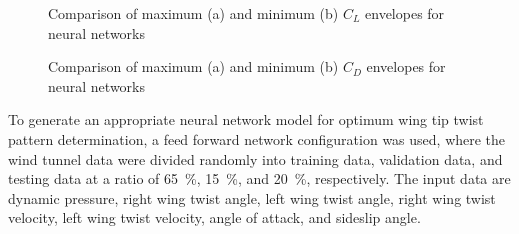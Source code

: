 \documentclass[11pt]{ucthesis}
\begin{document}
\begin{figure}[thpb]
\centering
{} 
\caption{Comparison of maximum (a) and minimum (b) $C_L$ envelopes for neural networks}
\label{fig:NNCLMax}
\end{figure}

\begin{figure}[thpb]
\centering
{} 
\caption{Comparison of maximum (a) and minimum (b) $C_D$ envelopes for neural networks}
\label{fig:NNCDMax}
\end{figure}

To generate an appropriate neural network model for optimum wing tip twist pattern determination, a feed forward network configuration was used, where the wind tunnel data were divided randomly into training data, validation data, and testing data at a ratio of 65~\%, 15~\%, and 20~\%, respectively. The input data are dynamic pressure, right wing twist angle, left wing twist angle, right wing twist velocity, left wing twist velocity, angle of attack, and sideslip angle.
\end{document}

